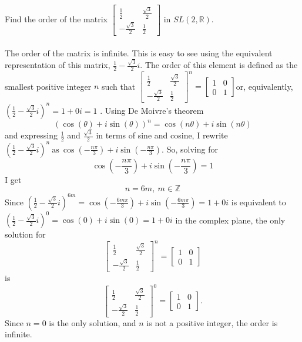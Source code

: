 \documentclass[titlepage]{article}
\newenvironment{problem}[2][Problem]{\begin{trivlist}
\item[\hskip \labelsep {\bfseries #1}\hskip \labelsep {\bfseries #2.}]}{\end{trivlist}}
\begin{document}
\begin{problem}{5}
Find the order of the matrix $ \begin{bmatrix}\frac{1}{2} & \frac{\sqrt{3}}{2} \\ -\frac{\sqrt{3}}{2} & \frac{1}{2} \end{bmatrix}$ in $SL(2,\mathbb{R})$.
\\ \\
The order of the matrix is infinite. This is easy to see using the equivalent representation of this matrix, $\frac{1}{2} - \frac{\sqrt{3}}{2}i$. The order of this element is defined as the smallest positive integer $n$ such that $\left[\begin{smallmatrix}\frac{1}{2} & \frac{\sqrt{3}}{2} \\ -\frac{\sqrt{3}}{2} & \frac{1}{2} \end{smallmatrix}\right]^n = \left[\begin{smallmatrix}1 & 0\\ 0 & 1 \end{smallmatrix}\right]$or, equivalently, $(\frac{1}{2} - \frac{\sqrt{3}}{2}i)^n = 1 +0i = 1$ . Using De Moivre's theorem
$$(\cos{(\theta)} + i\sin{(\theta)})^n = \cos{(n\theta)} + i\sin{(n\theta)}$$
and expressing $\frac{1}{2}$ and $\frac{\sqrt{3}}{2}$ in terms of sine and cosine, I rewrite $(\frac{1}{2} - \frac{\sqrt{3}}{2}i)^n \ \text{as} \ \cos{(-\frac{n\pi}{3})} + i\sin{(-\frac{n\pi}{3})} $. So, solving for $$\cos{(-\frac{n\pi}{3})} + i\sin{(-\frac{n\pi}{3})} = 1$$ I get $$n = 6m, \ m\in \mathbb{Z}$$ 
Since $(\frac{1}{2} - \frac{\sqrt{3}}{2}i)^{6m} = \cos(-\frac{6m\pi}{3}) + i\sin(-\frac{6m\pi}{3}) = 1 +0i $ is equivalent to $(\frac{1}{2} - \frac{\sqrt{3}}{2}i)^0 = \cos(0) + i\sin(0) = 1 + 0i$ in the complex plane, the only solution for
 $$\begin{bmatrix}\frac{1}{2} & \frac{\sqrt{3}}{2} \\ -\frac{\sqrt{3}}{2} & \frac{1}{2} \end{bmatrix}^n =  \begin{bmatrix}1 & 0 \\ 0 & 1 \end{bmatrix} $$
 is 
 $$\begin{bmatrix}\frac{1}{2} & \frac{\sqrt{3}}{2} \\ -\frac{\sqrt{3}}{2} & \frac{1}{2} \end{bmatrix}^0 = \begin{bmatrix}1 & 0 \\ 0 & 1 \end{bmatrix}.$$ Since $n=0$ is the only solution, and $n$ is not a positive integer, the order is infinite.

\end{problem}
\end{document}
